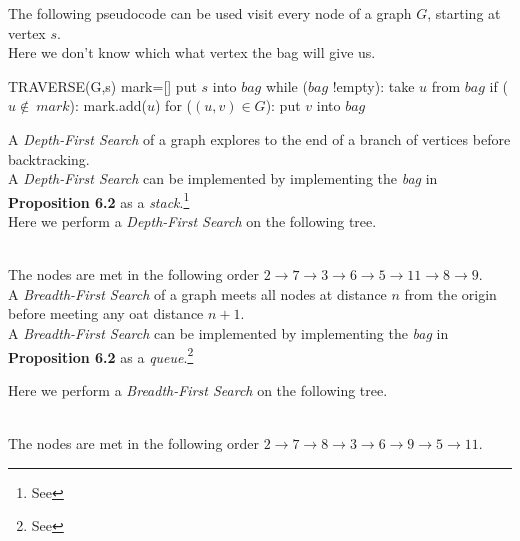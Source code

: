 \documentclass[11pt,a4paper]{article}
\begin{document}
The following pseudocode can be used visit every node of a graph $G$, starting at vertex $s$.\\
Here we don't know which what vertex the bag will give us.
\begin{code}
TRAVERSE(G,s)
mark=[]
put $s$ into $bag$
while ($bag$ !empty):
  take $u$ from $bag$
  if ($u\not\in\ mark$):
    mark.add($u$)
    for ($(u,v)\in G$):
      put $v$ into $bag$
\end{code}

A \textit{Depth-First Search} of a graph explores to the end of a branch of vertices before backtracking.\\
A \textit{Depth-First Search} can be implemented by implementing the \textit{bag} in \textbf{Proposition 6.2} as a \textit{stack}.\footnote{See {}}\\

\newpage
{}
Here we perform a \textit{Depth-First Search} on the following tree.\\
\\
The nodes are met in the following order $2\to7\to3\to6\to5\to11\to8\to9$.\\

A \textit{Breadth-First Search} of a graph meets all nodes at distance $n$ from the origin before meeting any oat distance $n+1$.\\
A \textit{Breadth-First Search} can be implemented by implementing the \textit{bag} in \textbf{Proposition 6.2} as a \textit{queue}.\footnote{See {}}

Here we perform a \textit{Breadth-First Search} on the following tree.\\
\\
The nodes are met in the following order $2\to7\to8\to3\to6\to9\to5\to11$.
\end{document}
